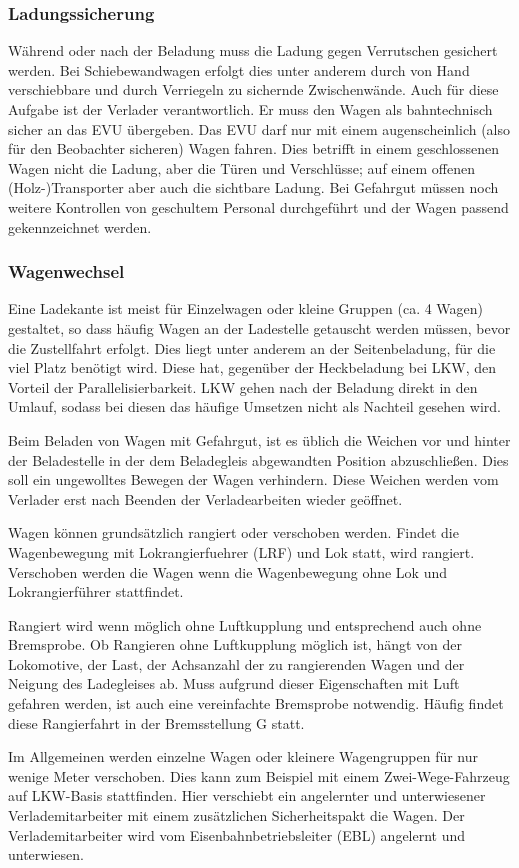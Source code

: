 \subsubsection{Ladungssicherung}
Während oder nach der Beladung muss die Ladung gegen Verrutschen gesichert werden. Bei Schiebewandwagen erfolgt dies unter anderem durch von Hand verschiebbare und durch Verriegeln zu sichernde Zwischenwände. Auch für diese Aufgabe ist der Verlader verantwortlich. Er muss den Wagen als bahntechnisch sicher an das EVU übergeben. Das EVU darf nur mit einem augenscheinlich (also für den Beobachter sicheren) Wagen fahren. Dies betrifft in einem geschlossenen Wagen nicht die Ladung, aber die Türen und Verschlüsse; auf einem offenen (Holz-)Transporter aber auch die sichtbare Ladung. Bei Gefahrgut müssen noch weitere Kontrollen von geschultem Personal durchgeführt und der Wagen passend gekennzeichnet werden.
\subsubsection{Wagenwechsel}\label{sec:Wagenwechsel}
Eine Ladekante ist meist für Einzelwagen oder kleine Gruppen (ca. 4 Wagen) gestaltet, so dass häufig Wagen an der Ladestelle getauscht werden müssen, bevor die Zustellfahrt erfolgt. Dies liegt unter anderem an der Seitenbeladung, für die viel Platz benötigt wird. Diese hat, gegenüber der Heckbeladung bei LKW, den Vorteil der Parallelisierbarkeit. LKW gehen nach der Beladung direkt in den Umlauf, sodass bei diesen das häufige Umsetzen nicht als Nachteil gesehen wird. \par
Beim Beladen von Wagen mit Gefahrgut, ist es üblich die Weichen vor und hinter der Beladestelle in der dem Beladegleis abgewandten Position abzuschließen. Dies soll ein ungewolltes Bewegen der Wagen verhindern. Diese Weichen werden vom Verlader erst nach Beenden der Verladearbeiten wieder geöffnet.\par
Wagen können grundsätzlich rangiert oder verschoben werden. Findet die Wagenbewegung mit \gls{Lokrangierfuehrer} (\acrshort{LRF}) und Lok statt, wird rangiert. Verschoben werden die Wagen wenn die Wagenbewegung ohne Lok und Lokrangierführer stattfindet.\par
Rangiert wird wenn möglich ohne Luftkupplung und entsprechend auch ohne \gls{Bremsprobe}. Ob Rangieren ohne Luftkupplung möglich ist, hängt von der Lokomotive, der Last, der Achsanzahl der zu rangierenden Wagen und der Neigung des Ladegleises ab. Muss aufgrund dieser Eigenschaften mit Luft gefahren werden, ist auch eine vereinfachte \gls{Bremsprobe} notwendig. Häufig findet diese Rangierfahrt in der Bremsstellung G statt.\par
Im Allgemeinen werden einzelne Wagen oder kleinere Wagengruppen für nur wenige Meter verschoben. Dies kann zum Beispiel mit einem Zwei-Wege-Fahrzeug auf LKW-Basis stattfinden. Hier verschiebt ein angelernter und unterwiesener Verlademitarbeiter mit einem zusätzlichen Sicherheitspakt die Wagen. Der Verlademitarbeiter wird vom \gls{Eisenbahnbetriebsleiter} (\acrshort{EBL}) angelernt und unterwiesen.
